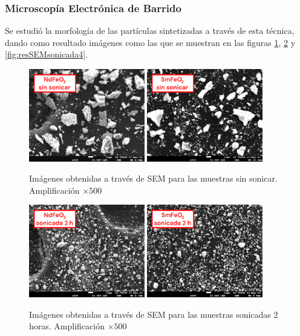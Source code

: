 \documentclass[../main.tex]{subfiles}
\begin{document}
\subsubsection{Microscopía Electrónica de Barrido}
Se estudió la morfología de las partículas sintetizadas a través de esta técnica, dando como resultado imágenes como las que se muestran en las figuras \ref{fig:resSEMsinsonicar}, \ref{fig:resSEMsonicada2} y \ref{fig:resSEMsonicada4}.
\begin{figure}[H]
    \centering
    \includegraphics[width=0.45\textwidth]{fig/semneod.png}
    \quad
    \includegraphics[width=0.45\textwidth]{fig/semsama.png}
    \caption{Imágenes obtenidas a través de SEM para las muestras sin sonicar. Amplificación $\times500$}
    \label{fig:resSEMsinsonicar}
\end{figure}
\begin{figure}[H]
    \centering
    \includegraphics[width=0.45\textwidth]{fig/semneod2h.png}
    \quad
    \includegraphics[width=0.45\textwidth]{fig/semsama2h.png}
    \caption{Imágenes obtenidas a través de SEM para las muestras sonicadas 2 horas. Amplificación $\times500$}
    \label{fig:resSEMsonicada2}
\end{figure}
\end{document}
